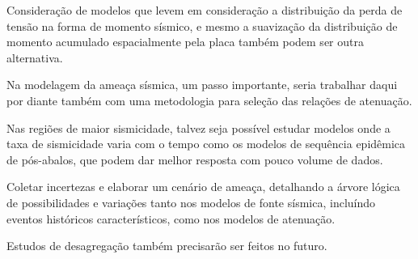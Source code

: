 Consideração de modelos que levem em consideração a distribuição da perda de tensão na forma de momento sísmico,
e mesmo a suavização da distribuição de momento acumulado espacialmente pela placa também podem ser outra alternativa.

Na modelagem da ameaça sísmica, um passo importante, seria trabalhar daqui por diante também com uma metodologia
para seleção das relações de atenuação.

Nas regiões de maior sismicidade, talvez seja possível estudar modelos onde a taxa de sismicidade varia com o tempo
como os modelos de sequência epidêmica de pós-abalos, que podem dar melhor resposta com pouco volume de dados.

Coletar incertezas e elaborar um cenário de ameaça,
detalhando a árvore lógica de possibilidades e variações
tanto nos modelos de fonte sísmica, incluíndo eventos históricos característicos, 
como nos modelos de atenuação. 

Estudos de desagregação \citep{pagani_2007} também precisarão ser feitos no futuro.

